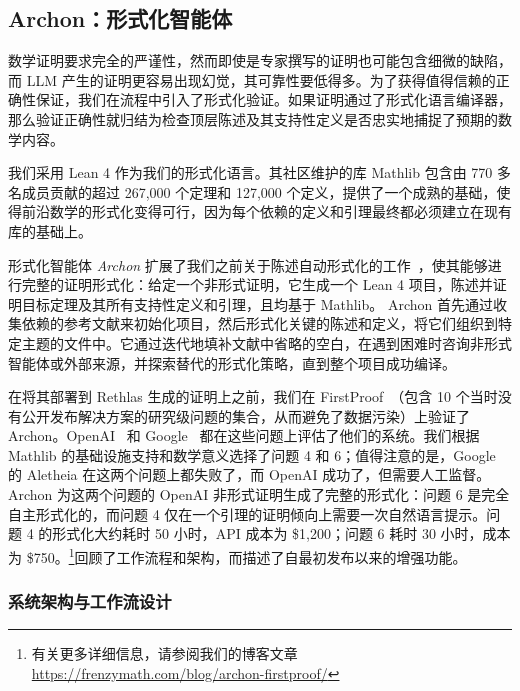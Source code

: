 ﻿\documentclass[]{pkuai4m}
\theoremstyle{plain}
\theoremstyle{definition}
\begin{document}
\subsection{Archon：形式化智能体}\label{subsec:archon}

数学证明要求完全的严谨性，然而即使是专家撰写的证明也可能包含细微的缺陷，而 LLM 产生的证明更容易出现幻觉，其可靠性要低得多。为了获得值得信赖的正确性保证，我们在流程中引入了形式化验证。如果证明通过了形式化语言编译器，那么验证正确性就归结为检查顶层陈述及其支持性定义是否忠实地捕捉了预期的数学内容。

我们采用 Lean 4 作为我们的形式化语言。其社区维护的库 Mathlib 包含由 770 多名成员贡献的超过 267,000 个定理和 127,000 个定义，提供了一个成熟的基础，使得前沿数学的形式化变得可行，因为每个依赖的定义和引理最终都必须建立在现有库的基础上。

形式化智能体 \textit{Archon} 扩展了我们之前关于陈述自动形式化的工作~\cite{gao2024herald, wang2025aria}，使其能够进行完整的证明形式化：给定一个非形式证明，它生成一个 Lean 4 项目，陈述并证明目标定理及其所有支持性定义和引理，且均基于 Mathlib。
Archon 首先通过收集依赖的参考文献来初始化项目，然后形式化关键的陈述和定义，将它们组织到特定主题的文件中。它通过迭代地填补文献中省略的空白，在遇到困难时咨询非形式智能体或外部来源，并探索替代的形式化策略，直到整个项目成功编译。

在将其部署到 Rethlas 生成的证明上之前，我们在 FirstProof~\cite{abouzaid2026first}（包含 10 个当时没有公开发布解决方案的研究级问题的集合，从而避免了数据污染）上验证了 Archon。OpenAI~\cite{openai_first_proof_2026} 和 Google~\cite{feng2026aletheia} 都在这些问题上评估了他们的系统。我们根据 Mathlib 的基础设施支持和数学意义选择了问题 4 和 6；值得注意的是，Google 的 Aletheia 在这两个问题上都失败了，而 OpenAI 成功了，但需要人工监督。Archon 为这两个问题的 OpenAI 非形式证明生成了完整的形式化：问题 6 是完全自主形式化的，而问题 4 仅在一个引理的证明倾向上需要一次自然语言提示。问题 4 的形式化大约耗时 50 小时，API 成本为 \$1,200；问题 6 耗时 30 小时，成本为 \$750。\footnote{有关更多详细信息，请参阅我们的博客文章 \url{https://frenzymath.com/blog/archon-firstproof/}}回顾了工作流程和架构，而描述了自最初发布以来的增强功能。

\subsubsection{系统架构与工作流设计\label{subsubsec:workflow}}
\end{document}
